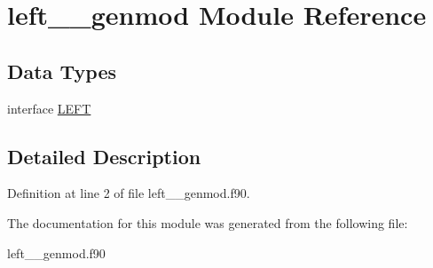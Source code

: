 \hypertarget{classleft____genmod}{\section{left\+\_\+\+\_\+genmod Module Reference}
\label{classleft____genmod}
}
\subsection*{Data Types}
\begin{DoxyCompactItemize}
\item 
interface \hyperlink{interfaceleft____genmod_1_1_l_e_f_t}{L\+E\+F\+T}
\end{DoxyCompactItemize}


\subsection{Detailed Description}


Definition at line 2 of file left\+\_\+\+\_\+genmod.\+f90.



The documentation for this module was generated from the following file\+:\begin{DoxyCompactItemize}
\item 
left\+\_\+\+\_\+genmod.\+f90\end{DoxyCompactItemize}
